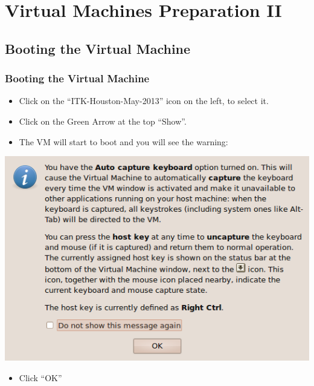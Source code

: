 \section{Virtual Machines Preparation II}


\subsection{Booting the Virtual Machine}
\begin{frame}
\frametitle{Booting the Virtual Machine}
\begin{itemize}
\item Click on the ``ITK-Houston-May-2013'' icon on the left, to select it.
\item Click on the Green Arrow at the top ``Show''.
\item The VM will start to boot and you will see the warning:
\end{itemize}
\begin{center}
  \includegraphics[width=0.4\paperwidth]{../Art/Screenshot-VirtualBox-OSE-02.png}
\end{center}
\begin{itemize}
\item Click ``OK''
\end{itemize}
\end{frame}

